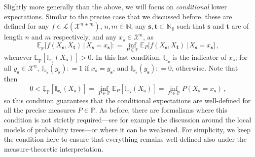 \documentclass[graybox]{svmult}
\newcommand{\nats}{\mathbb{N}}
\newcommand{\natswith}{\nats_{0}}
\newcommand{\states}{\mathcal{X}}
\newcommand{\gambles}{\mathcal{L}}
\newcommand{\coloneqq}{:\!=}
\begin{document}
Slightly more generally than the above, we will focus on \emph{conditional} lower expectations. Similar to the precise case that we discussed before, these are defined for any $f\in\gambles(\states^{n+m})$, $n,m\in\nats$, any $\mathbf{s},\mathbf{t}\subset\natswith$ such that $\mathbf{s}$ and $\mathbf{t}$ are of length $n$ and $m$ respectively, and any $x_\mathbf{s}\in\states^n$, as
\begin{equation*}
\underline{\mathbb{E}}_\mathbb{P}\bigl[f(X_\mathbf{s},X_\mathbf{t})\,\big\vert\,X_\mathbf{s}=x_\mathbf{s}\bigr] \coloneqq \inf_{P\in\mathbb{P}} \mathbb{E}_P \bigl[f(X_\mathbf{s},X_\mathbf{t})\,\big\vert\,X_\mathbf{s}=x_\mathbf{s}\bigr]\,,
\end{equation*}
whenever $\underline{\mathbb{E}}_\mathbb{P}[\mathbb{I}_{x_\mathbf{s}}(X_\mathbf{s})]>0$. In this last condition, $\mathbb{I}_{x_\mathbf{s}}$ is the indicator of $x_\mathbf{s}$; for all $y_\mathbf{s}\in\states^n$, $\mathbb{I}_{x_\mathbf{s}}(y_\mathbf{s})\coloneqq 1$ if $x_\mathbf{s}=y_\mathbf{s}$, and $\mathbb{I}_{x_\mathbf{s}}(y_\mathbf{s})\coloneqq 0$, otherwise. Note that then
\begin{equation*}
0 < \underline{\mathbb{E}}_\mathbb{P}[\mathbb{I}_{x_\mathbf{s}}(X_\mathbf{s})] = \inf_{P\in\mathbb{P}} \mathbb{E}_P[\mathbb{I}_{x_\mathbf{s}}(X_\mathbf{s})] = \inf_{P\in\mathbb{P}} P(X_\mathbf{s}=x_\mathbf{s})\,,
\end{equation*}
so this condition guarantees that the conditional expectations are well-defined for all the precise measures $P\in\mathbb{P}$. As before, there are formalisms where this condition is not strictly required---see for example the discussion around the local models of probability trees---or where it can be weakened. For simplicity, we keep the condition here to ensure that everything remains well-defined also under the measure-theoretic interpretation.
\end{document}
